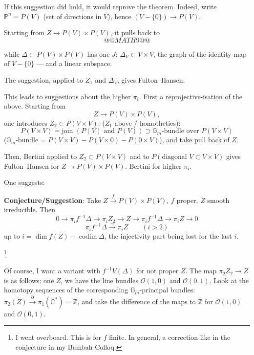 \documentclass[11pt,a4paper]{article}
\theoremstyle{plain}
\theoremstyle{definition}
\DeclareMathOperator{\codim}{codim}
\begin{document}
\medskip

If this suggestion did hold, it would reprove the theorem. Indeed, write $\mathbb{P}^n = P(V)$ (set of directions in $V$), hence $(V - \{0\}) \to P(V)$.

Starting from $Z \to P(V) \times P(V)$, it pulls back to
\[
@@MATH9@@
\]

\newpage

while $\Delta \subset P(V) \times P(V)$ has one $J$: $\Delta_V \subset V \times V$, the graph of the identity map of $V - \{0\}$ --- and a linear subspace.

The suggestion, applied to $Z_1$ and $\Delta_V$, gives Fulton--Hansen.

\medskip

This leads to suggestions about the higher $\pi_i$. First a reprojective-isation of the above. Starting from
\[
Z \longrightarrow P(V) \times P(V),
\]
one introduces $Z_2 \subset P(V \times V)$: ($Z_1$ above / homotheties):
\[
P(V \times V) = \text{join }(P(V) \text{ and } P(V)) \supset \mathbb{G}_m\text{-bundle over } P(V \times V)
\]
($\mathbb{G}_m$-bundle = $P(V \times V) - P(V \times 0) - P(0 \times V)$), and take pull back of $Z$.

Then, Bertini applied to $Z_2 \subset P(V \times V)$ and to $P(\text{diagonal } V \subset V \times V)$ gives Fulton--Hansen for $Z \to P(V) \times P(V)$. Bertini for higher $\pi_i$.

\medskip

One suggests:

\medskip

\noindent \textbf{Conjecture/Suggestion}: Take $Z \xrightarrow{f} P(V) \times P(V)$, $f$ proper, $Z$ smooth irreducible. Then
\[
0 \to \pi_i f^{-1}\Delta \to \pi_i Z_2 \to Z \to \pi_i f^{-1}\Delta \to \pi_i Z \to 0
\]
\[
\pi_i f^{-1}\Delta \xrightarrow{\sim} \pi_i Z \qquad (i > 2)
\]
up to $i = \dim f(Z) - \codim \Delta$, the injectivity part being lost for the last $i$.

\footnote{I went overboard. This is for $f$ finite. In general, a correction like in the conjecture in my Bambah Colloq.}

\medskip

Of course, I want a variant with $f^{-1}V(\Delta)$ for not proper $Z$. The map $\pi_2 Z_2 \to Z$ is as follows: one $Z$, we have the line bundles $\mathcal{O}(1,0)$ and $\mathcal{O}(0,1)$. Look at the homotopy sequences of the corresponding $\mathbb{G}_m$-principal bundles: $\pi_2(Z) \xrightarrow{\partial} \pi_1(\mathbb{C}^*) = \mathbb{Z}$, and take the difference of the maps to $\mathbb{Z}$ for $\mathcal{O}(1,0)$ and $\mathcal{O}(0,1)$.
\end{document}
